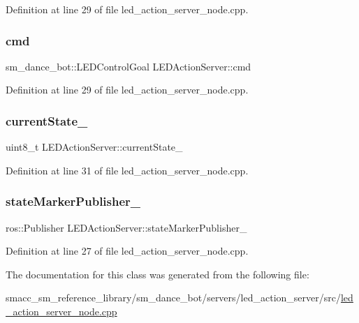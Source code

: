 Definition at line 29 of file led\+\_\+action\+\_\+server\+\_\+node.\+cpp.

\mbox{\label{classLEDActionServer_a4d3a4c07e7659cdd78228932bb1634d3}} 
\subsubsection{\texorpdfstring{cmd}{cmd}\hspace{0.1cm}{\footnotesize\ttfamily [3/3]}}
{\footnotesize\ttfamily sm\+\_\+dance\+\_\+bot\+::\+L\+E\+D\+Control\+Goal L\+E\+D\+Action\+Server\+::cmd}



Definition at line 29 of file led\+\_\+action\+\_\+server\+\_\+node.\+cpp.

\mbox{\label{classLEDActionServer_a1dc456e987dc331501ad6ff2215661ff}} 
\subsubsection{\texorpdfstring{current\+State\+\_\+}{currentState\_}}
{\footnotesize\ttfamily uint8\+\_\+t L\+E\+D\+Action\+Server\+::current\+State\+\_\+}



Definition at line 31 of file led\+\_\+action\+\_\+server\+\_\+node.\+cpp.

\mbox{\label{classLEDActionServer_a4168a1e4a17eb1d65aaa059ce0c52086}} 
\subsubsection{\texorpdfstring{state\+Marker\+Publisher\+\_\+}{stateMarkerPublisher\_}}
{\footnotesize\ttfamily ros\+::\+Publisher L\+E\+D\+Action\+Server\+::state\+Marker\+Publisher\+\_\+}



Definition at line 27 of file led\+\_\+action\+\_\+server\+\_\+node.\+cpp.



The documentation for this class was generated from the following file\+:\begin{DoxyCompactItemize}
\item 
smacc\+\_\+sm\+\_\+reference\+\_\+library/sm\+\_\+dance\+\_\+bot/servers/led\+\_\+action\+\_\+server/src/\hyperlink{servers_2led__action__server_2src_2led__action__server__node_8cpp}{led\+\_\+action\+\_\+server\+\_\+node.\+cpp}\end{DoxyCompactItemize}
